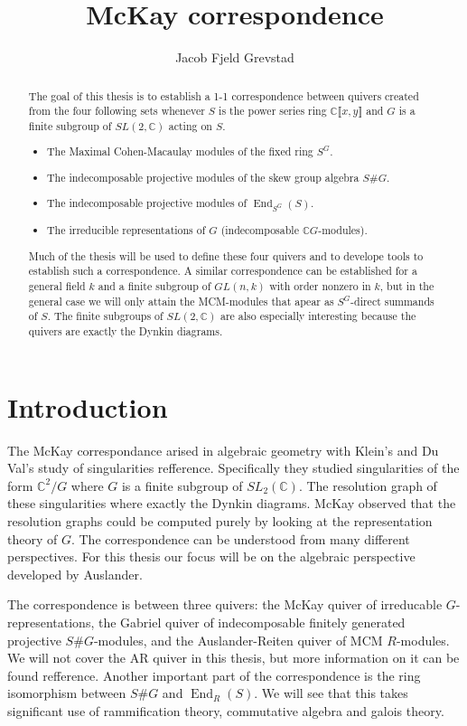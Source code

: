 \documentclass[11pt, a4paper, english]{article}
\numberwithin{prop}{section}
\numberwithin{lemma}{section}
\numberwithin{theorem}{section}
\numberwithin{defin}{section}
\numberwithin{example}{section}
\newcommand{\C}{\mathbb{C}}
\DeclareMathOperator{\End}{End}
\begin{document}
\title{McKay correspondence}
\author{Jacob Fjeld Grevstad}
\maketitle

\begin{abstract}
The goal of this thesis is to establish a 1-1 correspondence between quivers created from the four following sets whenever $S$ is the power series ring $\C \llbracket x, y \rrbracket$ and $G$ is a finite subgroup of $SL(2,\C)$ acting on $S$.
\begin{itemize}
\item The Maximal Cohen-Macaulay modules of the fixed ring $S^G$.
\item The indecomposable projective modules of the skew group algebra $S\#G$.
\item The indecomposable projective modules of $\End_{S^G}(S)$.
\item The irreducible representations of $G$ (indecomposable $\C G$-modules).
\end{itemize}
Much of the thesis will be used to define these four quivers and to develope tools to establish such a correspondence. A similar correspondence can be established for a general field $k$ and a finite subgroup of $GL(n, k)$ with order nonzero in $k$, but in the general case we will only attain the MCM-modules that apear as $S^G$-direct summands of $S$. The finite subgroups of $SL(2, \C)$ are also especially interesting because the quivers are exactly the Dynkin diagrams.
\end{abstract}

\tableofcontents

\section{Introduction}
The McKay correspondance arised in algebraic geometry with Klein's and Du Val's study of singularities {\color{red} refference}. Specifically they studied singularities of the form $\C^2 / G$ where $G$ is a finite subgroup of $SL_2(\C)$. The resolution graph of these singularities where exactly the Dynkin diagrams. McKay observed that the resolution graphs could be computed purely by looking at the representation theory of $G$. The correspondence can be understood from many different perspectives. For this thesis our focus will be on the algebraic perspective developed by Auslander.

The correspondence is between three quivers: the McKay quiver of irreducable $G$-representations, the Gabriel quiver of indecomposable finitely generated projective $S\#G$-modules, and the Auslander-Reiten quiver of MCM $R$-modules. We will not cover the AR quiver in this thesis, but more information on it can be found {\color{red} refference}. Another important part of the correspondence is the ring isomorphism between $S\#G$ and $\End_R(S)$. We will see that this takes significant use of rammification theory, commutative algebra and galois theory.
\end{document}
